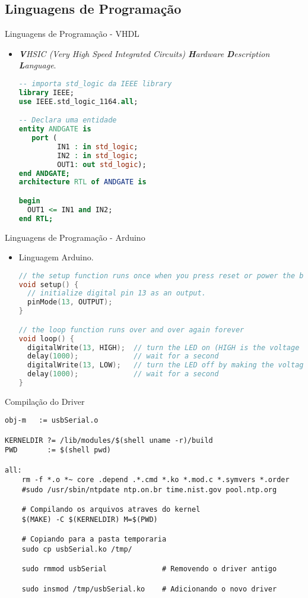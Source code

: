 	\subsection*{Linguagens de Programação}
	\begin{frame}[fragile]{Linguagens de Programação - VHDL}
		\begin{itemize}
			\item \textit{\textbf{V}HSIC (Very High Speed Integrated Circuits) \textbf{H}ardware \textbf{D}escription \textbf{L}anguage}.

		\begin{lstlisting}[language=VHDL]
-- importa std_logic da IEEE library
library IEEE;
use IEEE.std_logic_1164.all;

-- Declara uma entidade
entity ANDGATE is
   port ( 
         IN1 : in std_logic;
         IN2 : in std_logic;
         OUT1: out std_logic);
end ANDGATE;
architecture RTL of ANDGATE is

begin
  OUT1 <= IN1 and IN2;
end RTL;
		\end{lstlisting}
		\end{itemize}
\end{frame}
	\begin{frame}[fragile]{Linguagens de Programação - Arduino}
	\begin{itemize}
		\item Linguagem Arduino.
		\begin{lstlisting}[language=C++]
// the setup function runs once when you press reset or power the board
void setup() {
  // initialize digital pin 13 as an output.
  pinMode(13, OUTPUT);
}

// the loop function runs over and over again forever
void loop() {
  digitalWrite(13, HIGH);  // turn the LED on (HIGH is the voltage level)
  delay(1000);             // wait for a second
  digitalWrite(13, LOW);   // turn the LED off by making the voltage LOW
  delay(1000);             // wait for a second
}			
		\end{lstlisting} 
	\end{itemize}
\end{frame}

	\begin{frame}[fragile]{Compilação do Driver}
			\begin{lstlisting}
obj-m	:= usbSerial.o

KERNELDIR ?= /lib/modules/$(shell uname -r)/build
PWD       := $(shell pwd)

all:
	rm -f *.o *~ core .depend .*.cmd *.ko *.mod.c *.symvers *.order     
	#sudo /usr/sbin/ntpdate ntp.on.br time.nist.gov pool.ntp.org

	# Compilando os arquivos atraves do kernel
	$(MAKE) -C $(KERNELDIR) M=$(PWD)     
	
	# Copiando para a pasta temporaria
	sudo cp usbSerial.ko /tmp/        
	
	sudo rmmod usbSerial             # Removendo o driver antigo
	
	sudo insmod /tmp/usbSerial.ko    # Adicionando o novo driver
			\end{lstlisting}
\end{frame}

